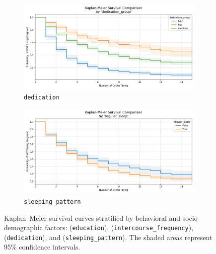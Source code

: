 \documentclass[11pt]{article}
\begin{document}
\begin{figure}[h]
  \begin{subfigure}{0.45\textwidth}
    \includegraphics[width=\linewidth]{plots/survival_comparison_dedication_group.jpg}
    \caption{\texttt{dedication}}
  \end{subfigure}
  \hfill
  \begin{subfigure}{0.45\textwidth}
    \includegraphics[width=\linewidth]{plots/survival_comparison_regular_sleep.jpg}
    \caption{\texttt{sleeping\_pattern}}
  \end{subfigure}

  \caption{
    Kaplan–Meier survival curves stratified by behavioral and socio-demographic factors: 
    (\texttt{education}), (\texttt{intercourse\_frequency}), (\texttt{dedication}), 
    and (\texttt{sleeping\_pattern}). The shaded areas represent 95\% confidence intervals.
  }
  \label{fig:survival_behavioral}
\end{figure}
\end{document}

